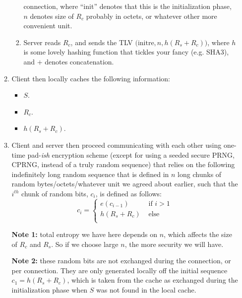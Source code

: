 \documentclass{article}
\begin{document}
\begin{enumerate}
\begin{enumerate}
\begin{enumerate}
                    connection, where ``init'' denotes that this is the
                    initialization phase, $n$ denotes size of $R_c$ probably in
                    octets, or whatever other more convenient unit.
                    \item Server reads $R_c$, and sends the TLV
                    $\big(\text{initre}, n, h(R_s + R_c)\big)$, where $h$ is
                    some lovely hashing function that tickles your fancy (e.g.
                    SHA3), and $+$ denotes concatenation.
                \end{enumerate}
            \item Client then locally caches the following information:
                \begin{itemize}
                    \item $S$.
                    \item $R_c$.
                    \item $h(R_s + R_c)$.
                \end{itemize}
            \item Client and server then proceed communicating with each other
            using one-time pad-\emph{ish} encryption scheme (except for using a
            seeded secure PRNG, CPRNG, instead of a truly random sequence) that
            relies on the following indefinitely long random sequence that is
            defined in $n$ long chunks of random bytes/octets/whatever unit we
            agreed about earlier, such that the $i^{th}$ chunk of random bits,
            $c_i$, is defined as follows:
            \begin{equation}
                c_i = 
                \begin{cases}
                    e(c_{i-1}) & \text{ if } i > 1\\
                    h(R_s + R_c) & \text{ else}\\
                \end{cases}
            \end{equation}

            \textbf{Note 1:} total entropy we have here depends on $n$, which
            affects the size of $R_c$ and $R_s$. So if we choose large $n$, the
            more security we will have.

            \textbf{Note 2:} these random bits are not exchanged during the
            connection, or per connection. They are only generated locally off
            the initial sequence $c_1 = h(R_s + R_c)$, which is taken from the
            cache as exchanged during the initialization phase when $S$ was not
            found in the local cache.


\end{enumerate}
\end{enumerate}
\end{document}
